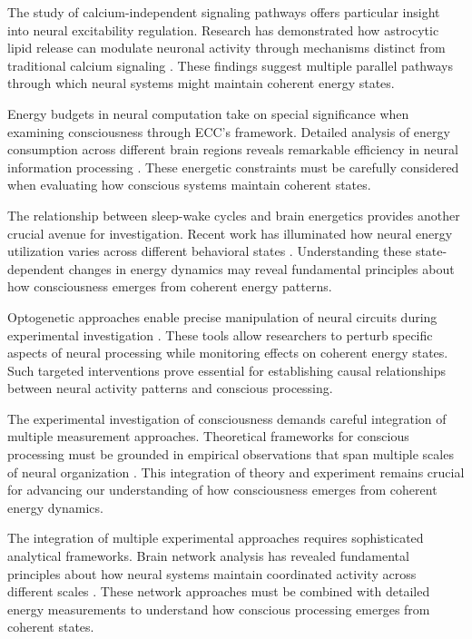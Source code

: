 \begin{refsection}
The study of calcium-independent signaling pathways offers particular insight into neural excitability regulation. Research has demonstrated how astrocytic lipid release can modulate neuronal activity through mechanisms distinct from traditional calcium signaling \cite{Chow2020}. These findings suggest multiple parallel pathways through which neural systems might maintain coherent energy states.

Energy budgets in neural computation take on special significance when examining consciousness through ECC's framework. Detailed analysis of energy consumption across different brain regions reveals remarkable efficiency in neural information processing \cite{Bezaires2013}. These energetic constraints must be carefully considered when evaluating how conscious systems maintain coherent states.

The relationship between sleep-wake cycles and brain energetics provides another crucial avenue for investigation. Recent work has illuminated how neural energy utilization varies across different behavioral states \cite{DiNuzzo2017}. Understanding these state-dependent changes in energy dynamics may reveal fundamental principles about how consciousness emerges from coherent energy patterns.

Optogenetic approaches enable precise manipulation of neural circuits during experimental investigation \cite{Yizhar2011}. These tools allow researchers to perturb specific aspects of neural processing while monitoring effects on coherent energy states. Such targeted interventions prove essential for establishing causal relationships between neural activity patterns and conscious processing.

The experimental investigation of consciousness demands careful integration of multiple measurement approaches. Theoretical frameworks for conscious processing must be grounded in empirical observations that span multiple scales of neural organization \cite{Dehaene2011}. This integration of theory and experiment remains crucial for advancing our understanding of how consciousness emerges from coherent energy dynamics.

The integration of multiple experimental approaches requires sophisticated analytical frameworks. Brain network analysis has revealed fundamental principles about how neural systems maintain coordinated activity across different scales \cite{Bassett2017}. These network approaches must be combined with detailed energy measurements to understand how conscious processing emerges from coherent states.


\end{refsection}
